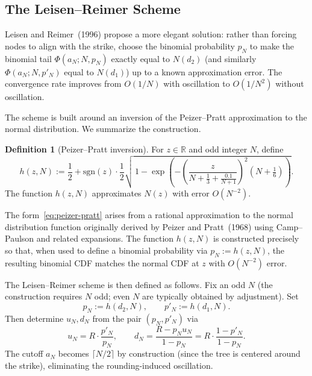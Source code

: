 \documentclass[11pt,a4paper]{article}
\theoremstyle{plain}
\theoremstyle{definition}
\newtheorem{definition}[theorem]{Definition}
\newcommand{\R}{\mathbb{R}}
\begin{document}
\subsection{The Leisen--Reimer Scheme}
\label{subsec:leisen-reimer}

Leisen and Reimer~(1996) propose a more elegant solution: rather than
forcing nodes to align with the strike, choose the binomial probability
$p_N$ to make the binomial tail $\Phi(a_N; N, p_N)$ exactly equal to
$N(d_2)$ (and similarly $\Phi(a_N; N, p'_N)$ equal to $N(d_1)$) up to a
known approximation error. The convergence rate improves from $O(1/N)$
with oscillation to $O(1/N^2)$ without oscillation.

The scheme is built around an inversion of the Peizer--Pratt
approximation to the normal distribution. We summarize the construction.

\begin{definition}[Peizer--Pratt inversion]
\label{def:peizer-pratt}
For $z \in \R$ and odd integer $N$, define
\begin{equation}
    \label{eq:peizer-pratt}
    h(z, N) := \frac{1}{2} + \mathrm{sgn}(z) \cdot \frac{1}{2}
    \sqrt{\,1 - \exp\!\left(
        -\!\left(\frac{z}{N + \tfrac{1}{3} + \tfrac{0.1}{N+1}}\right)^{\!2}
        \!\!\!\!\left(N + \tfrac{1}{6}\right)
    \right)}.
\end{equation}
The function $h(z, N)$ approximates $N(z)$ with error $O(N^{-2})$.
\end{definition}

The form~\eqref{eq:peizer-pratt} arises from a rational approximation
to the normal distribution function originally derived by
Peizer and Pratt~(1968) using Camp--Paulson and related expansions.
The function $h(z, N)$ is constructed precisely so that, when used to
define a binomial probability via $p_N := h(z, N)$, the resulting
binomial CDF matches the normal CDF at $z$ with $O(N^{-2})$ error.

The Leisen--Reimer scheme is then defined as follows. Fix an odd $N$
(the construction requires $N$ odd; even $N$ are typically obtained by
adjustment). Set
\begin{equation}
    \label{eq:LR-probabilities}
    p_N := h(d_2, N), \qquad p'_N := h(d_1, N).
\end{equation}
Then determine $u_N, d_N$ from the pair $(p_N, p'_N)$ via
\begin{equation}
    \label{eq:LR-uvd}
    u_N = R \cdot \frac{p'_N}{p_N},
    \qquad
    d_N = \frac{R - p_N u_N}{1 - p_N} = R \cdot \frac{1 - p'_N}{1 - p_N}.
\end{equation}
The cutoff $a_N$ becomes $\lceil N/2 \rceil$ by construction (since the
tree is centered around the strike), eliminating the rounding-induced
oscillation.
\end{document}

